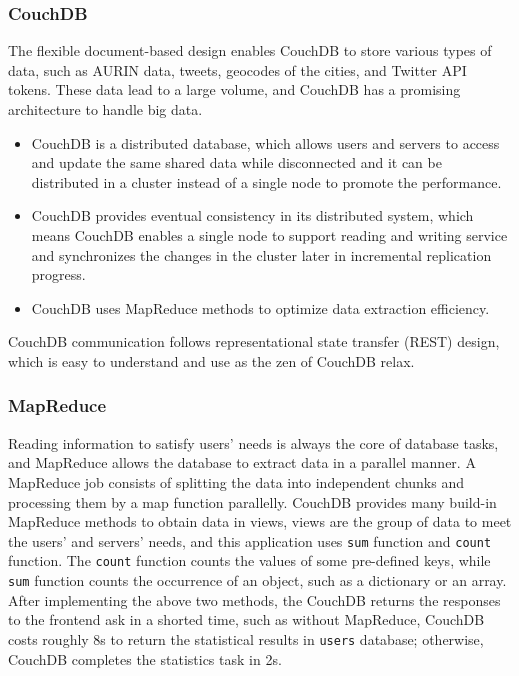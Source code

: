 \subsubsection{CouchDB}
The flexible document-based design enables CouchDB to store various types of data, such as AURIN data, tweets, geocodes of the cities, and Twitter API tokens. These data lead to a large volume,  and CouchDB has a promising architecture to handle big data. 
\begin{itemize}
    \item CouchDB is a distributed database, which allows users and servers to access and update the same shared data while disconnected and it can be distributed in a cluster instead of a single node to promote the performance. 
	\item CouchDB provides eventual consistency in its distributed system, which means CouchDB enables a single node to support reading and writing service and synchronizes the changes in the cluster later in incremental replication progress.
	\item CouchDB uses MapReduce methods to optimize data extraction efficiency.
\end{itemize}
CouchDB communication follows representational state transfer (REST) design, which is easy to understand and use as the zen of CouchDB relax. 

\subsubsection{MapReduce}
Reading information to satisfy users’ needs is always the core of database tasks, and MapReduce allows the database to extract data in a parallel manner. A MapReduce job consists of splitting the data into independent chunks and processing them by a map function parallelly. CouchDB provides many build-in MapReduce methods to obtain data in views, views are the group of data to meet the users’ and servers’ needs,  and this application uses \texttt{sum} function and \texttt{count} function. The \texttt{count} function counts the values of some pre-defined keys, while \texttt{sum} function counts the occurrence of an object, such as a dictionary or an array. After implementing the above two methods, the CouchDB returns the responses to the frontend ask in a shorted time, such as without MapReduce, CouchDB costs roughly 8s to return the statistical results in \texttt{users} database; otherwise, CouchDB completes the statistics task in 2s.

